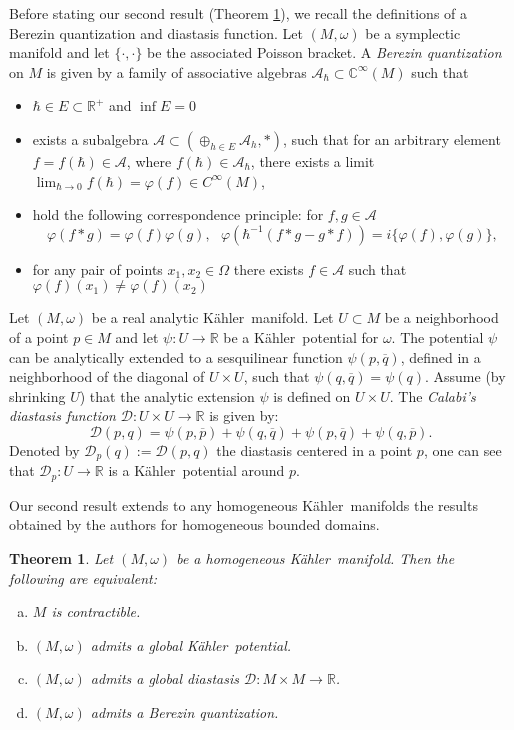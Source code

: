 \documentclass[reqno]{amsart}
\newtheorem{thm}{Theorem}[section]
\begin{document}
Before stating our second result (Theorem \ref{THM03}), we recall the definitions of a Berezin quantization and diastasis function. 
Let $(M, \omega)$ be a symplectic manifold and let $\lbrace \cdot, \cdot \rbrace$ be the associated Poisson bracket.
A {\em Berezin quantization} on $M$ is given by a family of associative algebras $\mathcal A_\hbar \subset {\mathbb{C}}^{\infty}(M)$ such that
\begin{itemize}
\item $\hbar \in E \subset {\mathbb{R}}^+$ and $\inf E =0$
\item exists a subalgebra ${\mathcal A}\subset (\oplus_{h \in E} \mathcal A_h,*)$, such that for an arbitrary element 
$f=f(\hbar)\in {\mathcal A}$, where $f(\hbar)\in {\mathcal A}_\hbar$, there exists a limit $\lim_{\hbar\rightarrow 0} f(\hbar)=\varphi (f)\in C^{\infty}(M)$,
\item hold the following correspondence principle: for $f, g \in {\mathcal A}$
$$\varphi (f*g)=\varphi (f)\varphi (g),\    \    \  \varphi\left(\hbar^{-1}(f*g-g*f)\right)=i\lbrace\varphi(f), \varphi (g)\rbrace,$$
\item for any pair of points $x_1,x_2 \in \Omega$ there exists $f \in \mathcal A $ such that $\varphi (f) (x_1) \neq \varphi(f)(x_2)$
\end{itemize}

Let $(M,\omega)$ be a real analytic {K\"{a}hler}\ manifold. Let $U \subset M$ be a neighborhood of a point $p \in M$ and let $\psi: U {\rightarrow} {\mathbb{R}}$ be a {K\"{a}hler}\ potential for $\omega$. The potential $\psi$ can be analytically extended to a sesquilinear function $ \psi(p, {\overline{q}})$, defined in a neighborhood of the diagonal of $U \times U$, such that $ \psi(q, {\overline{q}})=\psi(q)$. Assume   (by shrinking $U$)  that the analytic extension $ \psi$ is defined on $U \times U$.  The {\it Calabi's diastasis function} ${\mathcal{D}}:U \times U {\rightarrow} {\mathbb{R}}$ is given by:
\[
{\mathcal{D}}(p,q)=\psi(p,{\overline{p}})+\psi(q,{\overline{q}})+\psi(p,{\overline{q}})+\psi(q,{\overline{p}}).
\] 
Denoted by ${\mathcal{D}}_p(q):={\mathcal{D}}(p,q)$ the diastasis centered in a point $p$, one can see that ${\mathcal{D}}_p:U {\rightarrow} {\mathbb{R}}$ is a {K\"{a}hler}\ potential around $p$.  

Our second result extends to any homogeneous {K\"{a}hler}\ manifolds the results obtained by the authors  \cite{LM03} for homogeneous bounded domains.

\begin{thm}\label{THM03}
Let $(M, \omega)$ be a homogeneous {K\"{a}hler}\ manifold. Then the following are equivalent:
\begin{enumerate}[(a)]
\item $M$ is contractible.
\item $(M, \omega)$ admits a global {K\"{a}hler}\ potential.
\item $(M, \omega)$ admits a global diastasis ${\mathcal{D}}: M \times M {\rightarrow} {\mathbb{R}}$.
\item $(M, \omega)$ admits a Berezin quantization.
\end{enumerate} 
\end{thm}
\end{document}
